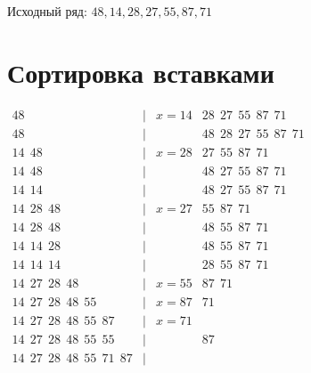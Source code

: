 \documentclass{article}
\begin{document}
Исходный ряд: $48, 14, 28, 27, 55, 87, 71$
\section*{Сортировка вставками}
$\begin{array}{rcll}
        48                                     & | & x = 14 & 28 ~~ 27 ~~ 55 ~~ 87 ~~ 71       \\
        48                                     & | &        & 48 ~~ 28 ~~ 27 ~~ 55 ~~ 87 ~~ 71 \\
        14 ~~ 48                               & | & x = 28 & 27 ~~ 55 ~~ 87 ~~ 71             \\
        14 ~~ 48                               & | &        & 48 ~~ 27 ~~ 55 ~~ 87 ~~ 71       \\
        14 ~~ 14                               & | &        & 48 ~~ 27 ~~ 55 ~~ 87 ~~ 71       \\
        14 ~~ 28 ~~ 48                         & | & x = 27 & 55 ~~ 87 ~~ 71                   \\
        14 ~~ 28 ~~ 48                         & | &        & 48 ~~ 55 ~~ 87 ~~ 71             \\
        14 ~~ 14 ~~ 28                         & | &        & 48 ~~ 55 ~~ 87 ~~ 71             \\
        14 ~~ 14 ~~ 14                         & | &        & 28 ~~ 55 ~~ 87 ~~ 71             \\
        14 ~~ 27 ~~ 28 ~~ 48                   & | & x = 55 & 87 ~~ 71                         \\
        14 ~~ 27 ~~ 28 ~~ 48 ~~ 55             & | & x = 87 & 71                               \\
        14 ~~ 27 ~~ 28 ~~ 48 ~~ 55 ~~ 87       & | & x = 71 &                                  \\
        14 ~~ 27 ~~ 28 ~~ 48 ~~ 55 ~~ 55       & | &        & 87                               \\
        14 ~~ 27 ~~ 28 ~~ 48 ~~ 55 ~~ 71 ~~ 87 & | &        &                                  \\
    \end{array}$
\end{document}
